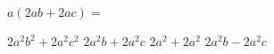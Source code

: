 
\question $a(2ab + 2ac) = $

  \begin{oneparchoices}
    \choice $2a^2b^2 + 2a^2c^2$
    \CorrectChoice $2a^2b + 2a^2c$
    \choice $2a^2 + 2a^2$
    \choice $2a^2b - 2a^2c$
  \end{oneparchoices}
